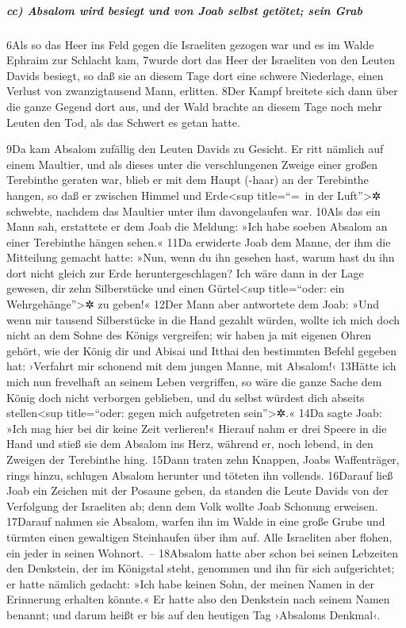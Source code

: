 \hypertarget{cc-absalom-wird-besiegt-und-von-joab-selbst-getuxf6tet-sein-grab}{%
\subparagraph{cc) Absalom wird besiegt und von Joab selbst getötet; sein
Grab}\label{cc-absalom-wird-besiegt-und-von-joab-selbst-getuxf6tet-sein-grab}}

6Als so das Heer ins Feld gegen die Israeliten gezogen war und es im
Walde Ephraim zur Schlacht kam, 7wurde dort das Heer der Israeliten von
den Leuten Davids besiegt, so daß sie an diesem Tage dort eine schwere
Niederlage, einen Verlust von zwanzigtausend Mann, erlitten. 8Der Kampf
breitete sich dann über die ganze Gegend dort aus, und der Wald brachte
an diesem Tage noch mehr Leuten den Tod, als das Schwert es getan hatte.

9Da kam Absalom zufällig den Leuten Davids zu Gesicht. Er ritt nämlich
auf einem Maultier, und als dieses unter die verschlungenen Zweige einer
großen Terebinthe geraten war, blieb er mit dem Haupt (-haar) an der
Terebinthe hangen, so daß er zwischen Himmel und Erde\textless sup
title=``=~in der Luft''\textgreater✲ schwebte, nachdem das Maultier
unter ihm davongelaufen war. 10Als das ein Mann sah, erstattete er dem
Joab die Meldung: »Ich habe soeben Absalom an einer Terebinthe hängen
sehen.« 11Da erwiderte Joab dem Manne, der ihm die Mitteilung gemacht
hatte: »Nun, wenn du ihn gesehen hast, warum hast du ihn dort nicht
gleich zur Erde heruntergeschlagen? Ich wäre dann in der Lage gewesen,
dir zehn Silberstücke und einen Gürtel\textless sup title=``oder: ein
Wehrgehänge''\textgreater✲ zu geben!« 12Der Mann aber antwortete dem
Joab: »Und wenn mir tausend Silberstücke in die Hand gezahlt würden,
wollte ich mich doch nicht an dem Sohne des Königs vergreifen; wir haben
ja mit eigenen Ohren gehört, wie der König dir und Abisai und Itthai den
bestimmten Befehl gegeben hat: ›Verfahrt mir schonend mit dem jungen
Manne, mit Absalom!‹ 13Hätte ich mich nun frevelhaft an seinem Leben
vergriffen, so wäre die ganze Sache dem König doch nicht verborgen
geblieben, und du selbst würdest dich abseits stellen\textless sup
title=``oder: gegen mich aufgetreten sein''\textgreater✲.« 14Da sagte
Joab: »Ich mag hier bei dir keine Zeit verlieren!« Hierauf nahm er drei
Speere in die Hand und stieß sie dem Absalom ins Herz, während er, noch
lebend, in den Zweigen der Terebinthe hing. 15Dann traten zehn Knappen,
Joabs Waffenträger, rings hinzu, schlugen Absalom herunter und töteten
ihn vollends. 16Darauf ließ Joab ein Zeichen mit der Posaune geben, da
standen die Leute Davids von der Verfolgung der Israeliten ab; denn dem
Volk wollte Joab Schonung erweisen. 17Darauf nahmen sie Absalom, warfen
ihn im Walde in eine große Grube und türmten einen gewaltigen
Steinhaufen über ihm auf. Alle Israeliten aber flohen, ein jeder in
seinen Wohnort.~-- 18Absalom hatte aber schon bei seinen Lebzeiten den
Denkstein, der im Königstal steht, genommen und ihn für sich
aufgerichtet; er hatte nämlich gedacht: »Ich habe keinen Sohn, der
meinen Namen in der Erinnerung erhalten könnte.« Er hatte also den
Denkstein nach seinem Namen benannt; und darum heißt er bis auf den
heutigen Tag ›Absaloms Denkmal‹.

